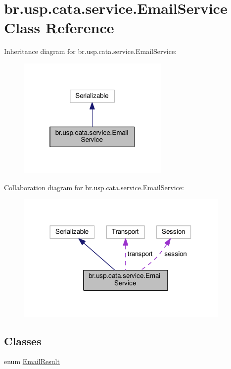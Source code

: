 \hypertarget{classbr_1_1usp_1_1cata_1_1service_1_1_email_service}{\section{br.\+usp.\+cata.\+service.\+Email\+Service Class Reference}
\label{classbr_1_1usp_1_1cata_1_1service_1_1_email_service}
}


Inheritance diagram for br.\+usp.\+cata.\+service.\+Email\+Service\+:\nopagebreak
\begin{figure}[H]
\begin{center}
\leavevmode
\includegraphics[width=208pt]{classbr_1_1usp_1_1cata_1_1service_1_1_email_service__inherit__graph}
\end{center}
\end{figure}


Collaboration diagram for br.\+usp.\+cata.\+service.\+Email\+Service\+:\nopagebreak
\begin{figure}[H]
\begin{center}
\leavevmode
\includegraphics[width=294pt]{classbr_1_1usp_1_1cata_1_1service_1_1_email_service__coll__graph}
\end{center}
\end{figure}
\subsection*{Classes}
\begin{DoxyCompactItemize}
\item 
enum \hyperlink{enumbr_1_1usp_1_1cata_1_1service_1_1_email_service_1_1_email_result}{Email\+Result}
\end{DoxyCompactItemize}
